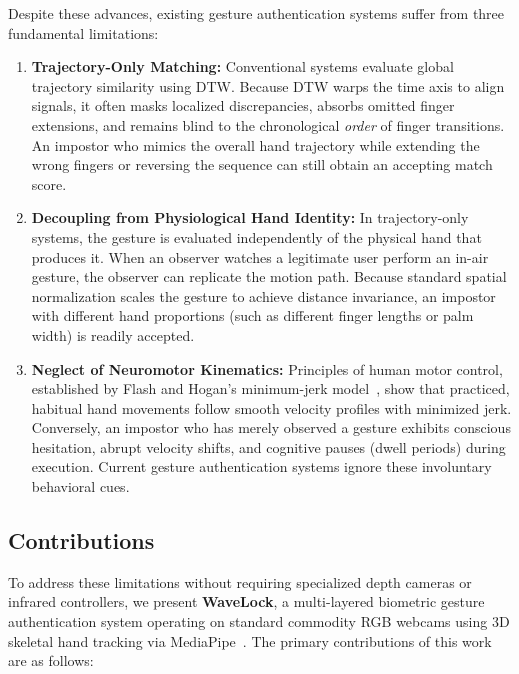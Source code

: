 \documentclass[conference]{IEEEtran}
\begin{document}
Despite these advances, existing gesture authentication systems suffer from three fundamental limitations:

\begin{enumerate}
\item \textbf{Trajectory-Only Matching:} Conventional systems evaluate global trajectory similarity using DTW. Because DTW warps the time axis to align signals, it often masks localized discrepancies, absorbs omitted finger extensions, and remains blind to the chronological \textit{order} of finger transitions. An impostor who mimics the overall hand trajectory while extending the wrong fingers or reversing the sequence can still obtain an accepting match score.

\item \textbf{Decoupling from Physiological Hand Identity:} In trajectory-only systems, the gesture is evaluated independently of the physical hand that produces it. When an observer watches a legitimate user perform an in-air gesture, the observer can replicate the motion path. Because standard spatial normalization scales the gesture to achieve distance invariance, an impostor with different hand proportions (such as different finger lengths or palm width) is readily accepted.

\item \textbf{Neglect of Neuromotor Kinematics:} Principles of human motor control, established by Flash and Hogan's minimum-jerk model~\cite{flash1985}, show that practiced, habitual hand movements follow smooth velocity profiles with minimized jerk. Conversely, an impostor who has merely observed a gesture exhibits conscious hesitation, abrupt velocity shifts, and cognitive pauses (dwell periods) during execution. Current gesture authentication systems ignore these involuntary behavioral cues.
\end{enumerate}

\subsection{Contributions}

To address these limitations without requiring specialized depth cameras or infrared controllers, we present \textbf{WaveLock}, a multi-layered biometric gesture authentication system operating on standard commodity RGB webcams using 3D skeletal hand tracking via MediaPipe~\cite{mediapipe}. The primary contributions of this work are as follows:
\end{document}

